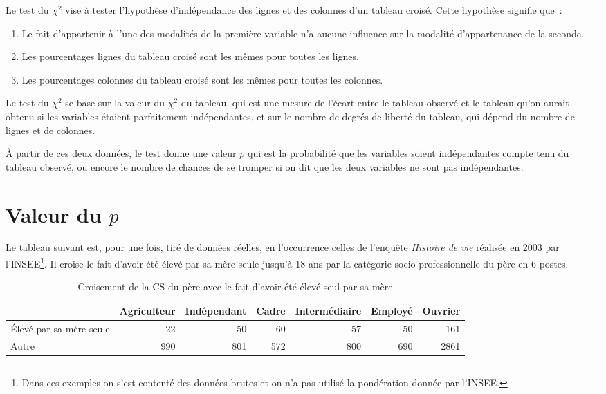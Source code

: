 \documentclass[a4paper,10pt,twoside,francais]{report}
\newcommand{\chid}{$\chi^2$\xspace}
\begin{document}
Le test du \chid vise à tester l'hypothèse d'indépendance des lignes
et des colonnes d'un tableau croisé. Cette hypothèse signifie que~:
\begin{enumerate}
\item Le fait d'appartenir à l'une des modalités de la première
  variable n'a aucune influence sur la modalité d'appartenance de la
  seconde.
\item Les pourcentages lignes du tableau croisé sont les mêmes pour
  toutes les lignes.
\item Les pourcentages colonnes du tableau croisé sont les mêmes pour
  toutes les colonnes.
\end{enumerate}

Le test du \chid se base sur la valeur du \chid du tableau, qui est
une mesure de l'écart entre le tableau observé et le tableau qu'on
aurait obtenu si les variables étaient parfaitement indépendantes, et
sur le nombre de degrés de liberté du tableau, qui dépend du nombre de
lignes et de colonnes.

À partir de ces deux données, le test donne une valeur $p$ qui est la
probabilité que les variables soient indépendantes compte tenu du
tableau observé, ou encore le nombre de chances de se tromper si on
dit que les deux variables ne sont pas indépendantes.


\section{Valeur du \texorpdfstring{$p$}{p}}
\label{ssec-valp}


Le tableau suivant est, pour une fois, tiré de données réelles, en
l'occurrence celles de l'enquête \textit{Histoire de vie} réalisée en
2003 par l'INSEE\footnote{Dans ces exemples on s'est contenté des
  données brutes et on n'a pas utilisé la pondération donnée par
  l'INSEE.}. Il croise le fait d'avoir été élevé par sa mère seule
jusqu'à 18 ans par la catégorie socio-professionnelle du père en 6
postes.


\begin{table}[H]
  \begin{center}
    \small
    \begin{tabular}[!h]{lrrrrrr}
      \toprule
      & Agriculteur & Indépendant & Cadre & Intermédiaire & Employé & Ouvrier\\
      \midrule
      Élevé par sa mère seule & 22 & 50 & 60 & 57 & 50 & 161 \\
      Autre & 990 & 801 & 572 & 800 & 690 & 2861 \\
      \bottomrule
    \end{tabular}
  \end{center}
  \caption{Croisement de la CS du père avec le fait d'avoir été élevé
    seul par sa mère}
  \label{cselev}
  \normalsize
\end{table}
\end{document}
